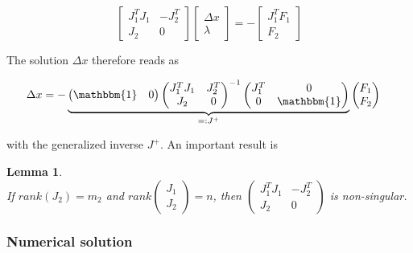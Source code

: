 \documentclass{scrartcl}[12pt, halfparskip]
\numberwithin{equation}{section}
\numberwithin{figure}{section}
\numberwithin{table}{section}
\newtheorem{Lemma}{Lemma}
\begin{document}
\begin{equation}
	\begin{bmatrix}
		J_1^T J_1 & -J_2^T \\
		J_2 & 0
	\end{bmatrix}
	\begin{bmatrix}
		\Delta x \\
		\lambda
	\end{bmatrix}
	= -
	\begin{bmatrix}
	J_1^T F_1 \\
	F_2
	\end{bmatrix}
	\label{eq:GN_KKT_system}
\end{equation}

The solution $\Delta x$ therefore reads as

\begin{align}
	\Delta x & =
	- \underbrace{\begin{pmatrix}
		\mathbbm{1} & 0
	\end{pmatrix}
	\begin{pmatrix}
		J_1^T J_1 & J_2^T \\
		J_2 & 0
	\end{pmatrix}^{-1}
	\begin{pmatrix}
		J_1^T & 0 \\
		0 & \mathbbm{1}
	\end{pmatrix}}_{=: J^+}
	\begin{pmatrix}
		F_1 \\
		F_2
	\end{pmatrix}
	\label{eq:GN_solution_formal}
\end{align}

with the generalized inverse $J^+$. An important result \cite{diss_bock} is

\begin{Lemma} \textcolor{white}{.}\\
	If $rank(J_2) = m_2$ and $rank 
	\begin{pmatrix}
	J_1 \\
	J_2
	\end{pmatrix}
	= n$,
	then 	
	$\begin{pmatrix}
		J_1^T J_1 & -J_2^T \\
		J_2 & 0
	\end{pmatrix}$
	is non-singular.
\end{Lemma}

\subsubsection{Numerical solution}
\label{sec:GN_numerical_solution}
\end{document}

